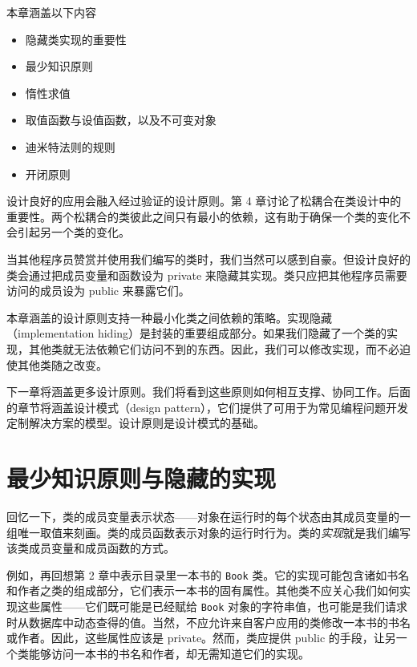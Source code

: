 \begin{myChapterIntro}{本章涵盖以下内容}
\begin{itemize}
\item 隐藏类实现的重要性
\item 最少知识原则
\item 惰性求值
\item 取值函数与设值函数，以及不可变对象
\item 迪米特法则的规则
\item 开闭原则
\end{itemize}
\end{myChapterIntro}

设计良好的应用会融入经过验证的设计原则。第 4 章讨论了松耦合在类设计中的重要性。两个松耦合的类彼此之间只有最小的依赖，这有助于确保一个类的变化不会引起另一个类的变化。


当其他程序员赞赏并使用我们编写的类时，我们当然可以感到自豪。但设计良好的类会通过把成员变量和函数设为 private 来隐藏其实现。类只应把其他程序员需要访问的成员设为 public 来暴露它们。

本章涵盖的设计原则支持一种最小化类之间依赖的策略。实现隐藏（implementation hiding）是封装的重要组成部分。如果我们隐藏了一个类的实现，其他类就无法依赖它们访问不到的东西。因此，我们可以修改实现，而不必迫使其他类随之改变。

下一章将涵盖更多设计原则。我们将看到这些原则如何相互支撑、协同工作。后面的章节将涵盖设计模式（design pattern），它们提供了可用于为常见编程问题开发定制解决方案的模型。设计原则是设计模式的基础。

\section{最少知识原则与隐藏的实现}

回忆一下，类的成员变量表示状态——对象在运行时的每个状态由其成员变量的一组唯一取值来刻画。类的成员函数表示对象的运行时行为。类的\emph{实现}就是我们编写该类成员变量和成员函数的方式。

例如，再回想第 2 章中表示目录里一本书的 \texttt{Book} 类。它的实现可能包含诸如书名和作者之类的组成部分，它们表示一本书的固有属性。其他类不应关心我们如何实现这些属性——它们既可能是已经赋给 \texttt{Book} 对象的字符串值，也可能是我们请求时从数据库中动态查得的值。当然，不应允许来自客户应用的类修改一本书的书名或作者。因此，这些属性应该是 private。然而，类应提供 public 的手段，让另一个类能够访问一本书的书名和作者，却无需知道它们的实现。

